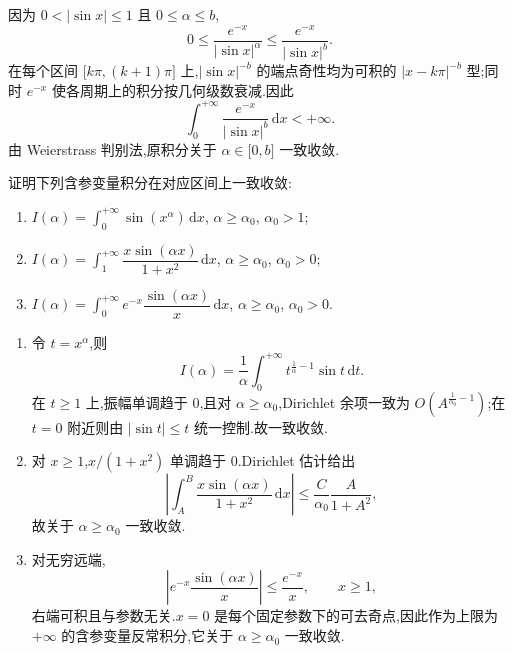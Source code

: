 \begin{solution}
    因为 $0<|\sin x|\leq1$ 且 $0\leq\alpha\leq b$,
    \[
        0\leq\dfrac{e^{-x}}{|\sin x|^\alpha}
        \leq\dfrac{e^{-x}}{|\sin x|^b}.
    \]
    在每个区间 $\lbrack k\pi,(k+1)\pi\rbrack$ 上,$|\sin x|^{-b}$ 的端点奇性均为可积的 $|x-k\pi|^{-b}$ 型;同时 $e^{-x}$ 使各周期上的积分按几何级数衰减.因此
    \[
        \displaystyle\int_0^{+\infty}\dfrac{e^{-x}}{|\sin x|^b}\,\mathrm{d}x<+\infty.
    \]
    由 Weierstrass 判别法,原积分关于 $\alpha\in\lbrack0,b\rbrack$ 一致收敛.
\end{solution}

\begin{example}
    证明下列含参变量积分在对应区间上一致收敛:
    \begin{enumerate}
        \item $\displaystyle I(\alpha)=\int_0^{+\infty}\sin(x^\alpha)\,\mathrm{d}x$, $\alpha\geq\alpha_0$, $\alpha_0>1$;
        \item $\displaystyle I(\alpha)=\int_1^{+\infty}\dfrac{x\sin(\alpha x)}{1+x^2}\,\mathrm{d}x$, $\alpha\geq\alpha_0$, $\alpha_0>0$;
        \item $\displaystyle I(\alpha)=\int_0^{+\infty}e^{-x}\dfrac{\sin(\alpha x)}{x}\,\mathrm{d}x$, $\alpha\geq\alpha_0$, $\alpha_0>0$.
    \end{enumerate}
\end{example}
\exampleblank

\begin{solution}
    \leavevmode
    \begin{enumerate}
        \item 令 $t=x^\alpha$,则
              \[
                  I(\alpha)=\dfrac{1}{\alpha}\int_0^{+\infty}t^{\frac{1}{\alpha}-1}\sin t\,\mathrm{d}t.
              \]
              在 $t\geq1$ 上,振幅单调趋于 $0$,且对 $\alpha\geq\alpha_0$,Dirichlet 余项一致为
              $O\left(A^{\frac{1}{\alpha_0}-1}\right)$;在 $t=0$ 附近则由 $|\sin t|\leq t$ 统一控制.故一致收敛.
        \item 对 $x\geq1$,$x/(1+x^2)$ 单调趋于 $0$.Dirichlet 估计给出
              \[
                  \left|\int_A^B\dfrac{x\sin(\alpha x)}{1+x^2}\,\mathrm{d}x\right|
                  \leq\dfrac{C}{\alpha_0}\dfrac{A}{1+A^2},
              \]
              故关于 $\alpha\geq\alpha_0$ 一致收敛.
        \item 对无穷远端,
              \[
                  \left|e^{-x}\dfrac{\sin(\alpha x)}{x}\right|\leq\dfrac{e^{-x}}{x},
                  \qquad x\geq1,
              \]
              右端可积且与参数无关.$x=0$ 是每个固定参数下的可去奇点,因此作为上限为 $+\infty$ 的含参变量反常积分,它关于 $\alpha\geq\alpha_0$ 一致收敛.
    \end{enumerate}
\end{solution}

